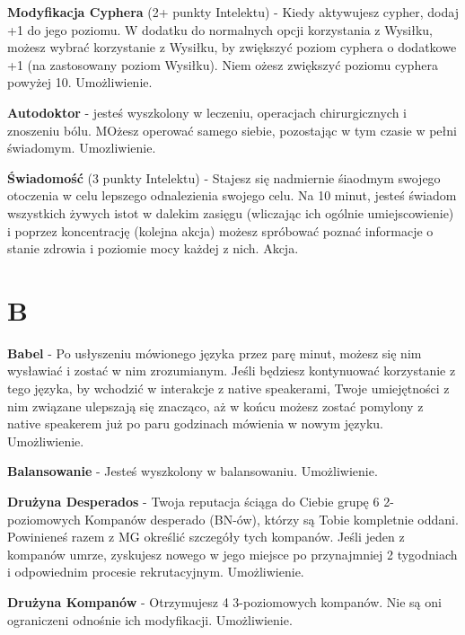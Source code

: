 \textbf{Modyfikacja Cyphera}\label{sec:Modyfikacja Cyphera} (2+ punkty Intelektu) - Kiedy aktywujesz cypher, dodaj +1 do jego poziomu. W dodatku do normalnych opcji korzystania z Wysiłku, możesz wybrać korzystanie z Wysiłku, by zwiększyć poziom cyphera o dodatkowe +1 (na zastosowany poziom Wysiłku). Niem ożesz zwiększyć poziomu cyphera powyżej 10. Umożliwienie.

\textbf{Autodoktor }\label{sec:Autodoktor} - jesteś wyszkolony w leczeniu, operacjach chirurgicznych i znoszeniu bólu. MOżesz operować samego siebie, pozostając w tym czasie w pełni świadomym. Umozliwienie. 

\textbf{Świadomość}\label{sec:Świadomość} (3 punkty Intelektu) - Stajesz się nadmiernie śiaodmym swojego otoczenia w celu lepszego odnalezienia swojego celu. Na 10 minut, jesteś świadom wszystkich żywych istot w dalekim zasięgu (wliczając ich ogólnie umiejscowienie) i poprzez koncentrację (kolejna akcja) możesz spróbować poznać informacje o stanie zdrowia i poziomie mocy każdej z nich. Akcja.

\section{B}

\textbf{Babel}\label{sec:Babel} - Po usłyszeniu mówionego języka przez parę minut, możesz się nim wysławiać i zostać w nim zrozumianym. Jeśli będziesz kontynuować korzystanie z tego języka, by wchodzić w interakcje z native speakerami, Twoje umiejętności z nim związane ulepszają się znacząco, aż w końcu możesz zostać pomylony z native speakerem już po paru godzinach mówienia w nowym języku. Umożliwienie.

\textbf{Balansowanie}\label{sec:Balansowanie} - Jesteś wyszkolony w balansowaniu. Umożliwienie. 

\textbf{Drużyna Desperados}\label{sec:Drużyna Desperados} - Twoja reputacja ściąga do Ciebie grupę 6 2-poziomowych Kompanów desperado (BN-ów), którzy są Tobie kompletnie oddani. Powinieneś razem z MG określić szczegóły tych kompanów. Jeśli jeden z kompanów umrze, zyskujesz nowego w jego miejsce po przynajmniej 2 tygodniach i odpowiednim procesie rekrutacyjnym. Umożliwienie. 

\textbf{Drużyna Kompanów}\label{sec:Drużyna Kompanów}  - Otrzymujesz 4 3-poziomowych kompanów. Nie są oni ograniczeni odnośnie ich modyfikacji. Umożliwienie.

